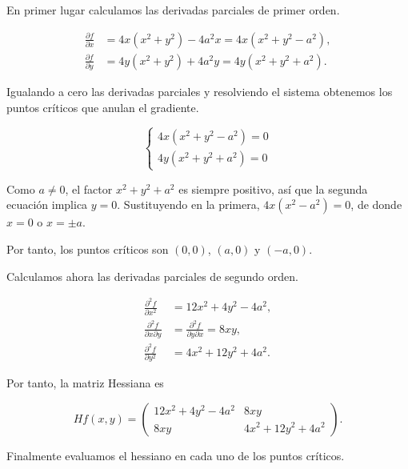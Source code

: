 \documentclass[
  spanish,
  a4paper,
]{scrreport}
\theoremstyle{definition}
\theoremstyle{remark}
\begin{document}
\begin{tcolorbox}[enhanced jigsaw, arc=.35mm, bottomrule=.15mm, bottomtitle=1mm, breakable, colback=white, colbacktitle=quarto-callout-tip-color!10!white, colframe=quarto-callout-tip-color-frame, coltitle=black, left=2mm, leftrule=.75mm, opacityback=0, opacitybacktitle=0.6, rightrule=.15mm, title=\textcolor{quarto-callout-tip-color}{\faLightbulb}\hspace{0.5em}{Solución}, titlerule=0mm, toprule=.15mm, toptitle=1mm]

En primer lugar calculamos las derivadas parciales de primer orden.

\[
\begin{aligned}
\frac{\partial f}{\partial x} &= 4x(x^2+y^2)-4a^2x = 4x(x^2+y^2-a^2),\\
\frac{\partial f}{\partial y} &= 4y(x^2+y^2)+4a^2y = 4y(x^2+y^2+a^2).
\end{aligned}
\]

Igualando a cero las derivadas parciales y resolviendo el sistema
obtenemos los puntos críticos que anulan el gradiente.

\[
\begin{cases}
4x(x^2+y^2-a^2)=0\\
4y(x^2+y^2+a^2)=0
\end{cases}
\]

Como \(a\neq 0\), el factor \(x^2+y^2+a^2\) es siempre positivo, así que
la segunda ecuación implica \(y=0\). Sustituyendo en la primera,
\(4x(x^2-a^2)=0\), de donde \(x=0\) o \(x=\pm a\).

Por tanto, los puntos críticos son \((0,0)\), \((a,0)\) y \((-a,0)\).

Calculamos ahora las derivadas parciales de segundo orden.

\[
\begin{aligned}
\frac{\partial^2 f}{\partial x^2} &= 12x^2+4y^2-4a^2,\\
\frac{\partial^2 f}{\partial x\partial y} &= \frac{\partial^2 f}{\partial y\partial x} = 8xy,\\
\frac{\partial^2 f}{\partial y^2} &= 4x^2+12y^2+4a^2.
\end{aligned}
\]

Por tanto, la matriz Hessiana es

\[
Hf(x,y)=\begin{pmatrix}
12x^2+4y^2-4a^2 & 8xy\\
8xy & 4x^2+12y^2+4a^2
\end{pmatrix}.
\]

Finalmente evaluamos el hessiano en cada uno de los puntos críticos.


\end{tcolorbox}
\end{document}

